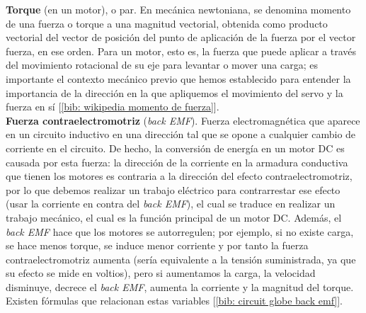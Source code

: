 \documentclass[12pt]{article}
\begin{document}
	\noindent \textbf{\large Torque} (en un motor), o par. En mecánica newtoniana, se denomina momento de una fuerza o torque a una magnitud vectorial, obtenida como producto vectorial del vector de posición del punto de aplicación de la fuerza por el vector fuerza, en ese orden. Para un motor, esto es, la fuerza que puede aplicar a través del movimiento rotacional de su eje para levantar o mover una carga; es importante el contexto mecánico previo que hemos establecido para entender la importancia de la dirección en la que apliquemos el movimiento del servo y la fuerza en sí [\ref{bib: wikipedia momento de fuerza}].\\
	
	\noindent \textbf{\large Fuerza contraelectromotriz} (\textit{back EMF}). Fuerza electromagnética que aparece en un circuito inductivo en una dirección tal que se opone a cualquier cambio de corriente en el circuito. De hecho, la conversión de energía en un motor DC es causada por esta fuerza: la dirección de la corriente en la armadura conductiva que tienen los motores es contraria a la dirección del efecto contraelectromotriz, por lo que debemos realizar un trabajo eléctrico para contrarrestar ese efecto (usar la corriente en contra del \textit{back EMF}), el cual se traduce en realizar un trabajo mecánico, el cual es la función principal de un motor DC. Además, el \textit{back EMF} hace que los motores se autorregulen; por ejemplo, si no existe carga, se hace menos torque, se induce menor corriente y por tanto la fuerza contraelectromotriz aumenta (sería equivalente a la tensión suministrada, ya que su efecto se mide en voltios), pero si aumentamos la carga, la velocidad disminuye, decrece el \textit{back EMF}, aumenta la corriente y la magnitud del torque. Existen fórmulas que relacionan estas variables [\ref{bib: circuit globe back emf}].\\
	
\end{document}

